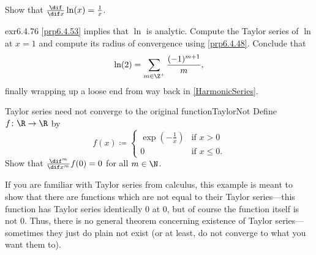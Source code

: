 \begin{exr}{}{}
Show that $\frac{\dif}{\dif x}\ln (x)=\frac{1}{x}$.
\end{exr}
\begin{exr}{}{exr6.4.76}
\cref{prp6.4.53} implies that $\ln$ is analytic.  Compute the Taylor series of $\ln$ at $x=1$ and compute its radius of convergence using \cref{prp6.4.48}.  Conclude that
\begin{equation}
\ln (2)=\sum _{m\in \Z ^+}\frac{(-1)^{m+1}}{m},
\end{equation}
finally wrapping up a loose end from way back in \cref{HarmonicSeries}.
\end{exr}
\begin{exr}{Taylor series need not converge to the original function}{TaylorNot}
Define $f\colon \R \rightarrow \R$ by
\begin{equation}
f(x)\coloneqq \begin{cases}\exp \left( -\tfrac{1}{x}\right) & \text{if }x>0 \\ 0 & \text{if }x\leq 0.\end{cases}
\end{equation}
Show that $\frac{\dif ^m}{\dif x^m}f(0)=0$ for all $m\in \N$.
\begin{rmk}
If you are familiar with Taylor series from calculus, this example is meant to show that there are functions which are not equal to their Taylor series---this function has Taylor series identically $0$ at $0$, but of course the function itself is not $0$.  Thus, there is no general theorem concerning existence of Taylor series---sometimes they just do plain not exist (or at least, do not converge to what you want them to).
\end{rmk}
\end{exr}


